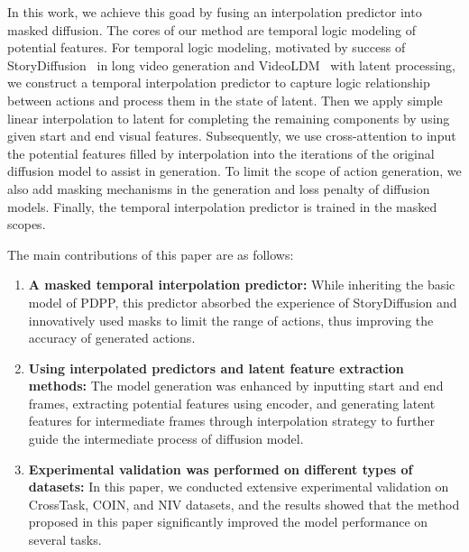 In this work, we achieve this goad by fusing an interpolation predictor into masked diffusion.  The cores of our method are temporal logic modeling of potential features. For temporal logic modeling, motivated by success of StoryDiffusion~\citep{zhou2024storydiffusion} in long video generation and VideoLDM~\citep{blattmann2023align} with latent processing, we construct a temporal interpolation predictor to capture logic relationship between actions and process them in the state of latent. Then we apply simple linear interpolation to latent for completing the remaining components by using given start and end visual features. Subsequently, we use cross-attention to input the potential features filled by interpolation into the iterations of the original diffusion model to assist in generation. To limit the scope of action generation, we also add masking mechanisms in the generation and loss penalty of diffusion models. Finally, the temporal interpolation predictor is trained in the masked scopes.


The main contributions of this paper are as follows:
\begin{enumerate}
 \item \textbf{A masked temporal interpolation predictor:} While inheriting the basic model of PDPP, this predictor absorbed the experience of StoryDiffusion and innovatively used masks to limit the range of actions, thus improving the accuracy of generated actions.
 \item \textbf{Using interpolated predictors and latent feature extraction methods:} The model generation was enhanced by inputting start and end frames, extracting potential features using encoder, and generating latent features for intermediate frames through interpolation strategy to further guide the intermediate process of diffusion model.
 \item \textbf{Experimental validation was performed on different types of datasets:} In this paper, we conducted extensive experimental validation on CrossTask, COIN, and NIV datasets, and the results showed that the method proposed in this paper significantly improved the model performance on several tasks.
\end{enumerate}
